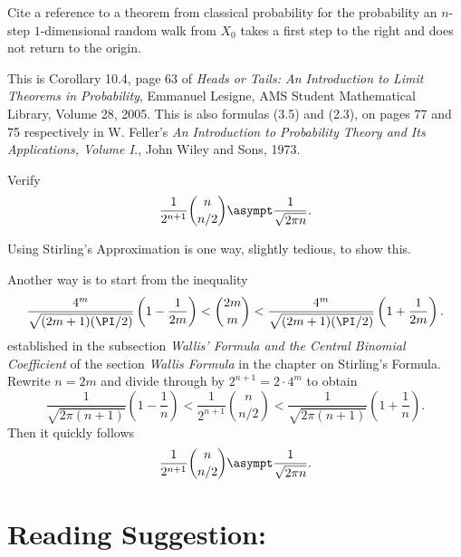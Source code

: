 \documentclass[12pt]{article}
\begin{document}
\begin{exercise}
    Cite a reference to a theorem from classical probability for the
    probability an \( n \)-step \( 1 \)-dimensional random walk from \(
    X_0 \) takes a first step to the right and does not return to the
    origin.
\end{exercise}
\begin{solution}
    This is Corollary 10.4, page 63 of \textit{Heads or Tails:  An
    Introduction to Limit Theorems in Probability}, Emmanuel Lesigne,
    AMS Student Mathematical Library, Volume 28, 2005.  This is also
    formulas (3.5) and (2.3), on pages 77 and 75 respectively in W.
    Feller's \textit{An Introduction to Probability Theory and Its
    Applications, Volume I.}, John Wiley and Sons, 1973.
\end{solution}

\begin{exercise}
    Verify
    \[
        \frac{1}{2^{n+1}}\binom{n}{n/2} \asympt \frac{1}{\sqrt{2 \pi n}}.
    \]
\end{exercise}
\begin{solution}
    Using Stirling's Approximation is one way, slightly tedious, to show
    this.

    Another way is to start from the inequality
    \[
        \frac{4^m}{\sqrt{(2m+1)(\PI/2)}}\left(1-\frac{1}{2m} \right) < {\binom
        {2m}{m}} < \frac{4^m}{\sqrt{(2m+1)(\PI/2)}} \left(1 + \frac{1}{2m}
        \right).
    \] established in the subsection \emph{Wallis' Formula and the
    Central Binomial Coefficient} of the section \emph{Wallis Formula}
    in the chapter on Stirling's Formula.  Rewrite \( n = 2m \) and
    divide through by \( 2^{n + 1} = 2 \cdot 4^m \) to obtain
    \[
        \frac{1}{\sqrt{2\pi(n+1)}} \left( 1 - \frac{1}{n} \right) <
        \frac{1}{2^{n+1}} \binom{n}{n/2} < \frac{1}{\sqrt{2\pi(n+1)}}
        \left( 1 + \frac{1}{n} \right).
    \] Then it quickly follows
    \[
        \frac{1}{2^{n+1}}\binom{n}{n/2} \asympt \frac{1}{\sqrt{2 \pi n}}.
    \]
\end{solution}

\hr

\section*{Reading Suggestion:}


\end{document}
